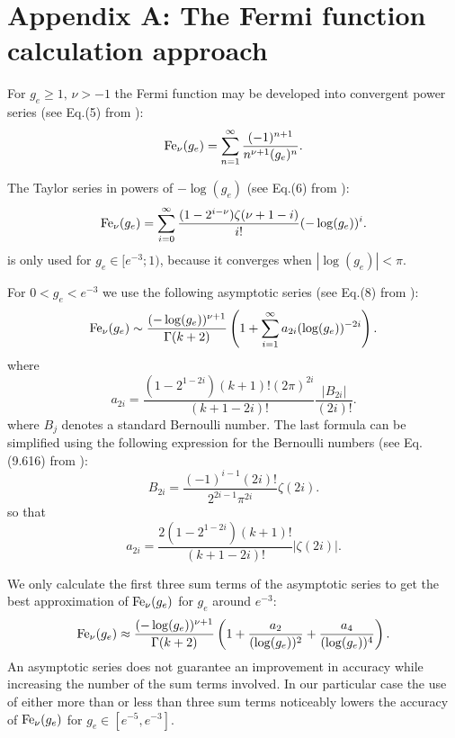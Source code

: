 
\section{Appendix A: The Fermi function calculation approach}

For $g_e\ge1,\,\nu>-1$ the Fermi function may be developed into
convergent power series (see Eq.(5) from \cite{mcleod}):
\begin{equation}
{\rm Fe}_\nu(g_e)=\sum_{n=1}^\infty{\frac{(-1)^{n+1}}{n^{\nu+1}(g_e)^n}}.
\end{equation} 

The Taylor series in powers of $-\log(g_e)$ (see Eq.(6) from \cite{mcleod}): %
\begin{equation}
{\rm Fe}_{\nu}(g_e) = \sum_{i=0}^\infty{\frac{(1-2^{i-\nu}) \zeta(\nu+1-i)}{i!} (-\log(g_e))^i}.
\end{equation}
is only used for $g_e \in [e^{-3}; 1)$, because it converges when $|\log(g_e)| < \pi$.

For $0 < g_e < e^{-3}$ we use the following asymptotic series (see Eq.(8) from \cite{mcleod}): %
\begin{equation}
{\rm Fe}_{\nu}(g_e) \sim \frac{(-\log(g_e))^{\nu+1}}{\Gamma(k+2)} \left(1 + \sum_{i=1}^\infty{a_{2i} (\log(g_e))^{-2i}}\right).
\end{equation}
where
\begin{equation}
a_{2i} = \frac{(1 - 2^{1-2i})(k+1)!(2\pi)^{2i}}{(k+1-2i)!} \frac{|B_{2i}|}{(2i)!}.
\end{equation}
where $B_j$ denotes a standard Bernoulli number. The last formula can be simplified using the following expression for the Bernoulli numbers (see Eq.(9.616) from \cite{gradshtein}):
\begin{equation}
B_{2i} = \frac{(-1)^{i-1} (2i)!}{2^{2i-1} \pi^{2i}} \zeta(2i).
\end{equation}
so that
\begin{equation}
a_{2i} = \frac{2 (1 - 2^{1-2i}) (k+1)!}{(k+1-2i)!} |\zeta(2i)|.
\end{equation}

We only calculate the first three sum terms of the asymptotic series to get the best
approximation of ${\rm Fe}_\nu(g_e)$ for $g_e$ around $e^{-3}$:
\begin{equation}
{\rm Fe}_\nu(g_e) \approx \frac{(-\log(g_e))^{\nu+1}}{\Gamma(k+2)} \left(1 + \frac{a_2}{(\log(g_e))^2} + \frac{a_4}{(\log(g_e))^4}\right).
\end{equation}
An  asymptotic series does not guarantee an improvement in accuracy while increasing the number of the sum terms
involved. In our particular case the use of either more than or less than three sum
terms noticeably lowers the accuracy of ${\rm Fe}_\nu(g_e)$ for $g_e \in [e^{-5}, e^{-3}]$.

